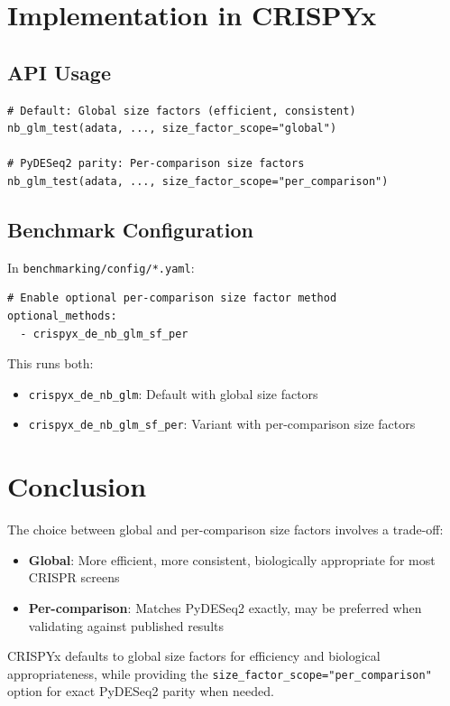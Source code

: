 \documentclass[11pt]{article}
\begin{document}
\section{Implementation in CRISPYx}

\subsection{API Usage}

\begin{verbatim}
# Default: Global size factors (efficient, consistent)
nb_glm_test(adata, ..., size_factor_scope="global")

# PyDESeq2 parity: Per-comparison size factors
nb_glm_test(adata, ..., size_factor_scope="per_comparison")
\end{verbatim}

\subsection{Benchmark Configuration}

In \texttt{benchmarking/config/*.yaml}:

\begin{verbatim}
# Enable optional per-comparison size factor method
optional_methods:
  - crispyx_de_nb_glm_sf_per
\end{verbatim}

This runs both:
\begin{itemize}
    \item \texttt{crispyx\_de\_nb\_glm}: Default with global size factors
    \item \texttt{crispyx\_de\_nb\_glm\_sf\_per}: Variant with per-comparison size factors
\end{itemize}

\section{Conclusion}

The choice between global and per-comparison size factors involves a trade-off:

\begin{itemize}
    \item \textbf{Global}: More efficient, more consistent, biologically appropriate for most CRISPR screens
    \item \textbf{Per-comparison}: Matches PyDESeq2 exactly, may be preferred when validating against published results
\end{itemize}

CRISPYx defaults to global size factors for efficiency and biological appropriateness, while providing the \texttt{size\_factor\_scope="per\_comparison"} option for exact PyDESeq2 parity when needed.
\end{document}
